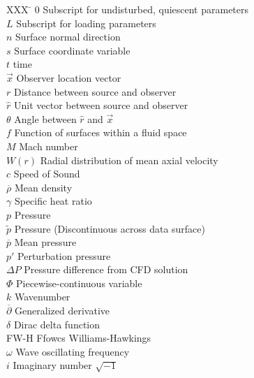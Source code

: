 \documentclass[]{aiaa-tc}%
\begin{document}
\begin{multicols}{2}
\begin{tabbing}
  XXX \= \kill%
  $0$                 \> Subscript for undisturbed, quiescent parameters \\
  $L$                 \> Subscript for loading parameters \\
  $n$                 \> Surface normal direction \\
  $s$                 \> Surface coordinate variable \\
  $t$                 \> time \\
  $\vec{x}$           \> Observer location vector \\
  $r$                 \> Distance between source and observer \\
  $\hat{r}$           \> Unit vector between source and observer \\
  $\theta$            \> Angle between $\hat{r}$ and $\vec{x}$ \\
  $f$                 \> Function of surfaces within a fluid space \\
  $M$                 \> Mach number \\
  $W(r)$              \> Radial distribution of mean axial velocity \\
  $c$                 \> Speed of Sound\\
  $\overline{\rho}$   \> Mean density \\
  $\gamma$            \> Specific heat ratio \\
  $p$                 \> Pressure  \\
  $\widetilde{p}$     \> Pressure (Discontinuous across data surface)  \\
  $\overline{p}$      \> Mean pressure \\
  $p'$                \> Perturbation pressure \\
  $\Delta P$          \> Pressure difference from CFD solution \\
  $\Phi$              \> Piecewise-continuous variable \\
  $k$                 \> Wavenumber \\
  $\overline{\partial}$ \> Generalized derivative \\
  $\delta$            \> Dirac delta function \\
  \scriptsize{FW-H}   \> Ffowcs Williams-Hawkings\\
  $\omega$            \> Wave oscillating frequency \\
  $i$                 \> Imaginary number $\sqrt{-1}$ \\

\end{tabbing}
\end{multicols}
\end{document}
